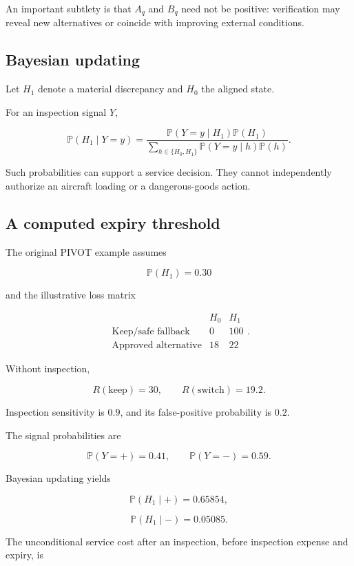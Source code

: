 \documentclass[10pt,a4paper]{article}
\newcommand{\PP}{\mathbb{P}}
\theoremstyle{plain}
\theoremstyle{definition}
\theoremstyle{remark}
\begin{document}
An important subtlety is that
\(A_q\) and \(B_q\) need not be positive:
verification may reveal new alternatives
or coincide with improving external conditions.

\subsection{Bayesian updating}

Let \(H_1\) denote a material discrepancy
and \(H_0\) the aligned state.

For an inspection signal \(Y\),

\begin{equation}
\PP(H_1\mid Y=y)
=
\frac{
  \PP(Y=y\mid H_1)\PP(H_1)
}{
  \sum_{h\in\{H_0,H_1\}}
  \PP(Y=y\mid h)\PP(h)
}.
\label{eq:bayes}
\end{equation}

Such probabilities can support a
service decision.
They cannot independently authorize
an aircraft loading or a dangerous-goods action.

\subsection{A computed expiry threshold}

The original PIVOT example assumes

\[
\PP(H_1)=0.30
\]

and the illustrative loss matrix

\[
\begin{array}{c|cc}
& H_0 & H_1\\
\hline
\text{Keep/safe fallback} & 0 & 100\\
\text{Approved alternative} & 18 & 22
\end{array}.
\]

Without inspection,

\[
R(\text{keep})=30,
\qquad
R(\text{switch})=19.2.
\]

Inspection sensitivity is \(0.9\),
and its false-positive probability is \(0.2\).

The signal probabilities are

\[
\PP(Y=+)=0.41,
\qquad
\PP(Y=-)=0.59.
\]

Bayesian updating yields

\[
\PP(H_1\mid +)=0.65854,
\]

\[
\PP(H_1\mid -)=0.05085.
\]

The unconditional service cost
after an inspection, before inspection
expense and expiry, is
\end{document}
